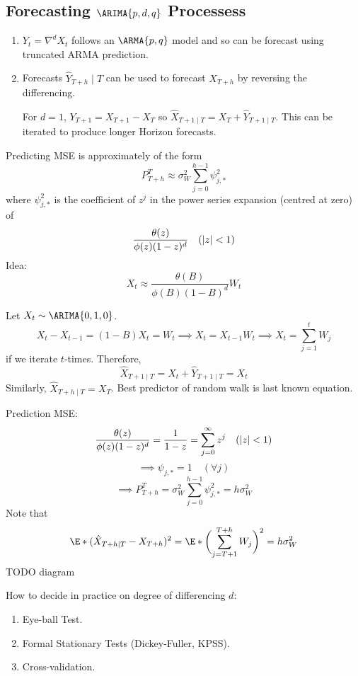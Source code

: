 \subsection*{Forecasting $ \ARIMA{p,d,q} $ Processess}
\begin{enumerate}[(1)]
    \item $ Y_t=\nabla^d X_t $ follows an $ \ARMA{p,q} $ model
          and so can be forecast using truncated ARMA prediction.
    \item Forecasts $ \hat{Y}_{T+h}\mid T $ can be used to forecast $ X_{T+h} $
          by reversing the differencing.
          \begin{Example}{}{}
              For $ d=1 $, $ Y_{T+1}=X_{T+1}-X_{T} $ so $ \hat{X}_{T+1\mid T}=X_T+\hat{Y}_{T+1\mid T} $.
              This can be iterated to produce longer Horizon forecasts.
          \end{Example}
\end{enumerate}
Predicting MSE is approximately of the form
\[ P_{T+h}^T\approx \sigma_W^2 \sum_{j=0}^{h-1} \psi^2_{j,*} \]
where $  \psi^2_{j,*} $ is the coefficient of $ z^j $ in the
power series expansion (centred at zero) of
\[ \frac{\theta(z)}{\phi(z)(1-z)^d} \quad(\lvert z\rvert<1) \]
Idea:
\[ X_t \approx \frac{\theta(B)}{\phi(B)(1-B)^d}W_t  \]
\begin{Example}{}{}
    Let $ X_t \sim \ARIMA{0,1,0} $.
    \[ X_t-X_{t-1}=(1-B)X_t=W_t\implies X_t=X_{t-1}W_t\implies X_t=\sum_{j=1}^{t} W_j \]
    if we iterate $ t $-times. Therefore,
    \[ \hat{X}_{T+1\mid T}=X_t+\hat{Y}_{T+1\mid T}=X_t \]
    Similarly, $ \hat{X}_{T+h\mid T}=X_T $. Best predictor of random
    walk is last known equation.

    Prediction MSE\@: \[ \frac{\theta(z)}{\phi(z)(1-z)^d}=\frac{1}{1-z} =\sum_{j=0}^{\infty} z^j\quad(\lvert z\rvert<1)  \]
    \[ \implies\psi_{j,*}=1\quad(\forall j) \]
    \[ \implies P_{T+h}^T=\sigma_W^2 \sum_{j=0}^{h-1} \psi_{j,*}^2=h\sigma_W^2 \]
    Note that
    \[ \E*{(\hat{X}_{T+h\mid T}-X_{T+h})^2}=\E*{\biggl(\sum_{j=T+1}^{T+h} W_j\biggr)^2}=h\sigma_W^2 \]
    TODO diagram
\end{Example}
How to decide in practice on degree of differencing $ d $:
\begin{enumerate}[(1)]
    \item Eye-ball Test.
    \item Formal Stationary Tests (Dickey-Fuller, KPSS).
    \item Cross-validation.
\end{enumerate}

